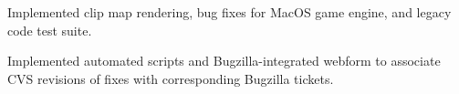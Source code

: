 \documentclass[]{jhearn-resume}
\begin{document}
\begin{minipage}[t]{0.64\textwidth}
%
\begin{tightemize}
\item Implemented clip map rendering, bug fixes for MacOS game engine, and legacy code test suite.
\end{tightemize}
\sectionsep
%
%
\begin{tightemize}
\item Implemented automated scripts and Bugzilla-integrated webform to
associate CVS revisions of fixes with corresponding Bugzilla tickets.
\end{tightemize}
\sectionsep

\end{minipage}
\hfill
\end{document}
